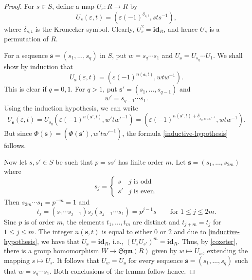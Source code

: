 \documentclass{article}
\theoremstyle{thmstyle}
\theoremstyle{defstyle}
\newcommand{\id}{\mathbf{id}}
\renewcommand{\le}{\leqslant}
\begin{document}
\begin{proof}
    For $s\in S$, define a map $U_s: R\to R$ by 
    \begin{equation*}
        U_s(\varepsilon, t) = \left(\varepsilon(-1)^{\delta_{s, t}}, sts^{-1}\right),
    \end{equation*}
    where $\delta_{s, t}$ is the Kronecker symbol. Clearly, $U_s^2 = \id_R$, and hence $U_s$ is a permutation of $R$.

    For a sequence $\mathbf s = (s_1,\dots,s_q)$ in $S$, put $w = s_q\cdots s_1$ and $U_{\mathbf s} = U_{s_q}\cdots U_1$. We shall show by induction that 
    \begin{equation}
        U_{\mathbf s}(\varepsilon, t) = \left(\varepsilon(-1)^{n(\mathbf s, t)}, wtw^{-1}\right). \label{inductive-hypothesis}
    \end{equation}
    This is clear if $q = 0, 1$. For $q > 1$, put $\mathbf s' = (s_1,\dots,s_{q - 1})$ and 
    \begin{equation*}
        w' = s_{q - 1}\cdots s_1.
    \end{equation*}
    Using the induction hypothesis, we can write 
    \begin{equation*}
        U_{\mathbf s}(\varepsilon, t) = U_{s_q} \left(\varepsilon (-1)^{n(\mathbf s', t)}, w'tw'^{-1}\right) = \left(\varepsilon (-1)^{n(\mathbf s', t) + \delta_{s_q, w' tw'^{-1}}}, wtw^{-1}\right).
    \end{equation*}
    But since $\Phi(\mathbf s) = \left(\Phi(\mathbf s'), w' t w'^{-1}\right)$, the formula \eqref{inductive-hypothesis} follows.

    Now let $s, s'\in S$ be such that $p = ss'$ has finite order $m$. Let $\mathbf s = (s_1,\dots,s_{2m})$ where 
    \begin{equation*}
        s_j = 
        \begin{cases}
            s & j\text{ is odd}\\
            s' & j\text{ is even}.
        \end{cases}
    \end{equation*}
    Then $s_{2m}\cdots s_1 = p^{-m} = 1$ and 
    \begin{equation*}
        t_j = (s_1\cdots s_{j - 1}) s_j(s_{j - 1}\cdots s_1) = p^{j - 1}s\qquad\text{for }1\le j\le 2m.
    \end{equation*}
    Sinc $p$ is of order $m$, the elements $t_1,\dots,t_m$ are distinct and $t_{j + m} = t_j$ for $1\le j\le m$. The integer $n(\mathbf s, t)$ is equal to either $0$ or $2$ and due to \eqref{inductive-hypothesis}, we have that $U_{\mathbf s} = \id_R$, i.e., $\left(U_s U_{s'}\right)^m = \id_R$. Thus, by \ref{coxeter}, there is a group homomorphism $W\to\mathfrak{Sym}(R)$ given by $w\mapsto U_w$, extending the mapping $s\mapsto U_s$. It follows that $U_w = U_{\mathbf s}$ for every sequence $\mathbf s = (s_1,\dots,s_q)$ such that $w = s_q\cdots s_1$. Both conclusions of the lemma follow hence.
\end{proof}
\end{document}
